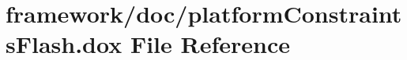 \hypertarget{platform_constraints_flash_8dox}{}\section{framework/doc/platform\+Constraints\+Flash.dox File Reference}
\label{platform_constraints_flash_8dox}
